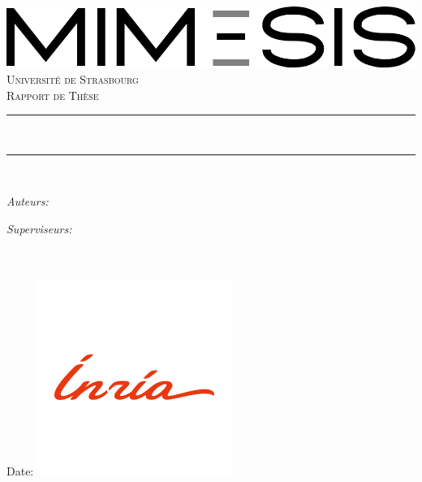 \begin{titlepage}

	\newcommand{\HRule}{\rule{\linewidth}{0.5mm}}
	
	\begin{center}
		\includegraphics[width = 0.5\linewidth]{logo-mimesis.png} \\ [1.5cm] 
	
		\textsc{\Large Université de Strasbourg}\\[0.5cm] 
		\textsc{\large Rapport de Thèse}\\[0.95cm] 
		
		\HRule \\[0.4cm]
		\huge\bfseries\reporttitle\par %
		\HRule \\[0.4cm]
	\end{center}
	
	\vspace{1cm}
	
	\begin{flushleft} \large
		\begin{minipage}{0.4\hsize}
			\textit{Auteurs:}\\
			\reportauthorOne
		\end{minipage} \hfill 
		\begin{minipage}{0.4\hsize}
			\textit{Superviseurs:}\\
			\reportsupervisorOne\\
			\reportsupervisorTwo\\
			\reportsupervisorThree
		\end{minipage}
	\end{flushleft}
	\vspace{2.5 cm}
	\makeatletter
	Date: \@date
	\hfill
	\includegraphics[width = 0.2\linewidth]{inria.png}\\[1.5cm] 
	
	\vfill %
	
	\makeatother


\end{titlepage}

